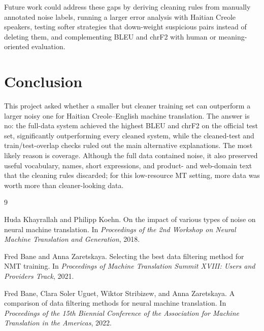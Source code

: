 \documentclass[11pt]{article}
\begin{document}
Future work could address these gaps by deriving cleaning rules from manually annotated noise labels, running a larger error analysis with Haitian Creole speakers, testing softer strategies that down-weight suspicious pairs instead of deleting them, and complementing BLEU and chrF2 with human or meaning-oriented evaluation.

\section{Conclusion}

This project asked whether a smaller but cleaner training set can outperform a larger noisy one for Haitian Creole--English machine translation. The answer is no: the full-data system achieved the highest BLEU and chrF2 on the official test set, significantly outperforming every cleaned system, while the cleaned-test and train/test-overlap checks ruled out the main alternative explanations. The most likely reason is coverage. Although the full data contained noise, it also preserved useful vocabulary, names, short expressions, and product- and web-domain text that the cleaning rules discarded; for this low-resource MT setting, more data was worth more than cleaner-looking data.

\begin{thebibliography}{9}

Huda Khayrallah and Philipp Koehn.
\newblock On the impact of various types of noise on neural machine translation.
\newblock In \emph{Proceedings of the 2nd Workshop on Neural Machine Translation and Generation}, 2018.

Fred Bane and Anna Zaretskaya.
\newblock Selecting the best data filtering method for NMT training.
\newblock In \emph{Proceedings of Machine Translation Summit XVIII: Users and Providers Track}, 2021.

Fred Bane, Clara Soler Uguet, Wiktor Stribizew, and Anna Zaretskaya.
\newblock A comparison of data filtering methods for neural machine translation.
\newblock In \emph{Proceedings of the 15th Biennial Conference of the Association for Machine Translation in the Americas}, 2022.

\end{thebibliography}
\end{document}
